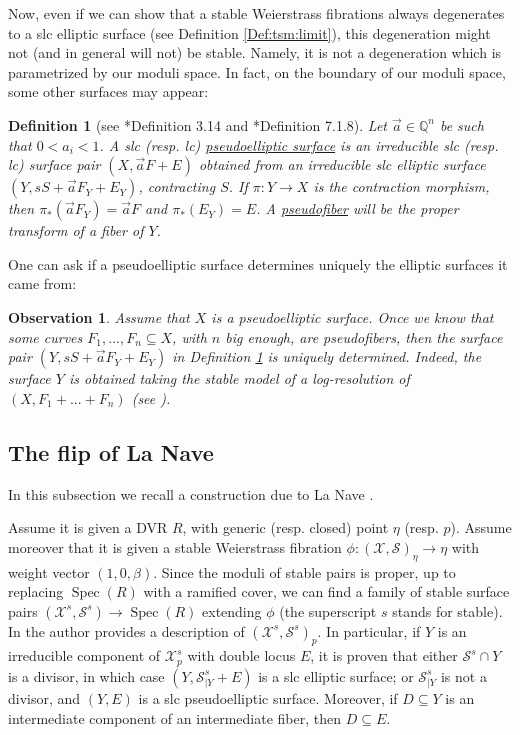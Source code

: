 \documentclass[11pt]{amsart}
\newcommand{\cX}{\mathcal{X}}
\newcommand{\cS}{\mathcal{S}}
\newcommand{\spec}{\operatorname{Spec}}
\newtheorem{Def}[theorem]{Definition}
\newtheorem{Oss}[theorem]{Observation}
\theoremstyle{definition}
\begin{document}
Now, even if we can show that a stable Weierstrass fibrations always degenerates to a slc elliptic surface (see Definition \ref{Def:tsm:limit}),
this degeneration might not (and in general will not) be stable. Namely, it is not a degeneration which is parametrized by our moduli space.
In fact, on the boundary of our moduli space, some other surfaces may appear:
\begin{Def}[see \cite{AB3}*{Definition 3.14} and \cite{LaNave}*{Definition 7.1.8}] \label{Def:pseudoelliptic}
 Let $\vec{a} \in \mathbb{Q}^n$ be such that
 $0< a_i< 1$. A slc (resp. lc) \underline{pseudoelliptic surface} is an irreducible slc (resp. lc) surface pair
 $(X,\vec{a}F+E)$ obtained from an irreducible slc elliptic surface $(Y,sS+\vec{a}F_Y+E_Y)$, contracting $S$. If $\pi:Y \to X$ is the contraction morphism, then $\pi_*(\vec{a}F_Y)=\vec{a}F$ and $\pi_*(E_Y)=E$. A \underline{pseudofiber} will be the proper transform of a fiber of $Y$.
\end{Def}
One can ask if a pseudoelliptic surface determines uniquely the elliptic surfaces it came from:
\begin{Oss}\label{Oss:section:uniquely:determined:on:psudo}
 Assume that $X$ is a pseudoelliptic surface. Once we know that some curves $F_1,...,F_n \subseteq X$, with $n$ big enough,
 are pseudofibers, then the surface pair $(Y,sS+\vec{a}F_Y+E_Y)$ in Definition \ref{Def:pseudoelliptic} is uniquely determined. Indeed, the surface $Y$ is obtained taking the stable model of a log-resolution of $(X,F_1+...+F_n)$ (see \cite{AB3}).
\end{Oss}
\subsection{The flip of La Nave}
In this subsection we recall a construction due to La Nave \cite{LaNave}.

Assume it is given a DVR $R$, with generic (resp. closed) point $\eta$ (resp. $p$).
Assume moreover that it is given a stable Weierstrass fibration $\phi:(\cX,\cS)_\eta \to \eta$ with weight vector $(1,0,\beta)$.
Since the moduli of stable pairs is proper, up to replacing $\spec(R)$ with a ramified cover, we can find a family of stable surface pairs
$(\cX^s,\cS^s) \to \spec(R)$ extending $\phi$ (the superscript $s$ stands for stable).
In \cite{LaNave} the author provides a description of $(\cX^s,\cS^s)_p$.
In particular, if $Y$ is an irreducible component of $\cX_p^s$ with double locus $E$,
it is proven that either $\cS^s \cap Y$ is a divisor, in which case $(Y,\cS^s_{|Y}+E)$ is a slc elliptic surface; or $\cS^s_{|Y}$ is not a divisor,
and $(Y,E)$ is a slc pseudoelliptic surface. Moreover, if $D \subseteq Y$ is an intermediate component of an intermediate fiber, then $D \subseteq E$.
\end{document}
